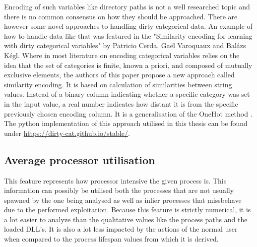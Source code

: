 \documentclass[a4paper,twoside,12pt]{book}
\begin{document}
Encoding of such variables like directory paths is not a well researched topic and there is no 
common consensus on how they should be approached. There are however some novel approaches to 
handling dirty categorical data. An example of how to handle data like that was featured in the 
"Similarity encoding for learning with dirty categorical variables" by Patricio Cerda,  Ga{\"e}l 
Varoquaux and Bal{\'a}zs K{\'e}gl. Where in most literature on encoding categorical variables 
relies on the idea that the set of categories is finite, known a priori, and composed of mutually 
exclusive elements, the authors of this paper propose a new approach called similarity encoding. 
It is based on calculation of similarities between string values. Instead of a binary column 
indicating whether a specific category was set in the input value, a real number indicates how 
distant it is from the specific previously chosen encoding column. It is a generalisation of the 
OneHot method \cite{bib:dirtycat}. The python implementation of this approach utilised in this thesis 
can be found under \url{https://dirty-cat.github.io/stable/}.


\subsection{Average processor utilisation}

This feature represents how processor intensive the given process is. This information can possibly 
be utilised both the processes that are not usually spawned by the one being analysed as well as
inlier processes that missbehave due to the performed exploitation. Because this feature is 
strictly numerical, it is a lot easier to analyze than the qualitative values like the process
paths and the loaded DLL's. It is also a lot less impacted by the actions of the normal user when
compared to the process lifespan values from which it is derived.


\end{document}
